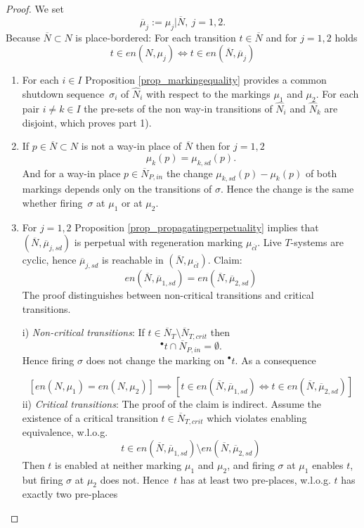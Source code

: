 \documentclass{fundam}
\begin{document}
\begin{proof}
We set
$$\overline{\mu}_j:=\mu_j|\overline{N},\ j=1,2.$$
Because $\overline{N} \subset N$ is place-bordered: For each transition $t \in \overline{N}$ and for $j=1,2$ holds
$$t \in en(N,\mu_j) \iff t \in en(\overline{N},\overline{\mu}_j)$$
\begin{enumerate}
\item For each $i \in I$ Proposition \ref{prop_markingequality} provides a common shutdown \mbox{sequence $\sigma_i$} of $\hat{N}_i$ with respect to the markings $\mu_1$ and $\mu_2$. For each pair $i \neq k \in I$ the pre-sets of the non way-in transitions of $\hat{N}_i$ and $\hat{N}_k$ are disjoint, which proves part 1).

\item If $p\in \overline{N} \subset N$ is not a way-in place of $\overline{N}$ then for $j=1,2$
$$\mu_k(p)=\mu_{k,sd}(p).$$
And for a way-in place $p\in \overline{N}_{P,in}$ the change $\mu_{k,sd}(p)-\mu_k(p)$ of both markings depends only on the transitions of $\sigma$. Hence the change is the same whether \mbox{firing $\sigma$} at $\mu_1$ or at $\mu_2$.
\item For $j=1,2$ Proposition \ref{prop_propagatingperpetuality} implies that $(\overline{N},\overline{\mu}_{j,sd})$ is perpetual with regeneration marking
$\mu_{\overline{cl}}$. Live $T$-systems are cyclic, hence $\overline{\mu}_{j,sd}$ is reachable in $(\overline{N},\mu_{\overline{cl}})$. Claim:
$$en(\overline{N},\overline{\mu}_{1,sd})=en(\overline{N},\overline{\mu}_{2,sd})$$
\eject
The proof distinguishes between non-critical transitions and critical transitions.
\begin{flushleft}
i) \emph{Non-critical transitions}: If $t \in \overline{N}_T\setminus \overline{N}_{T,crit}$ then
$$^\bullet t \cap \overline{N}_{P,in}=\emptyset.$$
Hence firing $\sigma$ does not change the marking on $^\bullet t$. As a consequence
\end{flushleft}
$$\left [en(N,\mu_1)=en(N,\mu_2)\right] \implies \left[t \in en(\overline{N},\overline{\mu}_{1,sd}) \iff t \in en(\overline{N},\overline{\mu}_{2,sd})\right]$$
ii) \emph{Critical transitions}: The proof of the claim is indirect. Assume the existence of a critical transition $t \in \overline{N}_{T,crit}$ which violates enabling equivalence, w.l.o.g.
$$t\in en(\overline{N},\overline{\mu}_{1,sd}) \setminus en(\overline{N},\overline{\mu}_{2,sd})$$
Then $t$ is enabled at neither marking $\mu_1$ and $\mu_2$, and firing $\sigma$ at $\mu_1$ enables $t$, but firing $\sigma$ at $\mu_2$ does not. \mbox{Hence $t$} has at least two pre-places, w.l.o.g. $t$ has exactly two pre-places

\end{enumerate}
\end{proof}
\end{document}
